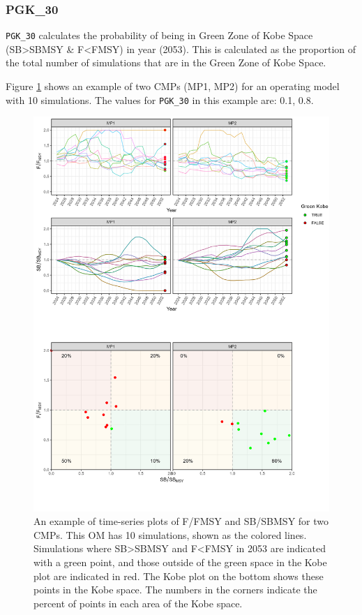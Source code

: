 \documentclass[
]{article}
\begin{document}
\hypertarget{pgk_30}{%
\subsubsection{PGK\_30}\label{pgk_30}}

\texttt{PGK\_30} calculates the probability of being in Green Zone of Kobe Space (SB\textgreater SBMSY \& F\textless FMSY) in year (2053). This is calculated as the proportion of the total number of simulations that are in the Green Zone of Kobe Space.

Figure \ref{fig:PGK30} shows an example of two CMPs (MP1, MP2) for an operating model with 10 simulations. The values for \texttt{PGK\_30} in this example are: 0.1, 0.8.

\begin{figure}
\includegraphics[width=37.5in]{../../img/PMs/PGK_30} \caption{An example of time-series plots of F/FMSY and SB/SBMSY for two CMPs. This OM has 10 simulations, shown as the colored lines. Simulations where SB>SBMSY and F<FMSY in 2053 are indicated with a green point, and those outside of the green space in the Kobe plot are indicated in red. The Kobe plot on the bottom shows these points in the Kobe space. The numbers in the corners indicate the percent of points in each area of the Kobe space.}\label{fig:PGK30}
\end{figure}
\end{document}

